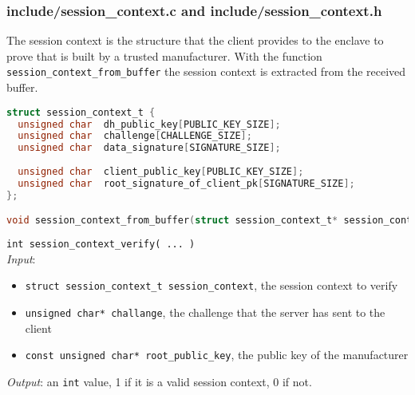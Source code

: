 \subsubsection{include/session\_context.c and include/session\_context.h}
The session context is the structure that the client provides to the enclave to prove that is built by a trusted manufacturer. With the function \texttt{session\_context\_from\_buffer} the session context is extracted from the received buffer. 
\begin{lstlisting}[language=C,frame=single]
struct session_context_t {
  unsigned char  dh_public_key[PUBLIC_KEY_SIZE];
  unsigned char  challenge[CHALLENGE_SIZE];
  unsigned char  data_signature[SIGNATURE_SIZE];
  
  unsigned char  client_public_key[PUBLIC_KEY_SIZE];
  unsigned char  root_signature_of_client_pk[SIGNATURE_SIZE];
};

void session_context_from_buffer(struct session_context_t* session_context, unsigned char* buffer);
\end{lstlisting}

\noindent
\texttt{int session\_context\_verify( ... )}\\
\textit{Input}:
\begin{itemize}[noitemsep,nolistsep]
  \item \texttt{struct session\_context\_t session\_context}, the session context to verify
  \item \texttt{unsigned char* challange}, the challenge that the server has sent to the client
  \item \texttt{const unsigned char* root\_public\_key}, the public key of the manufacturer
\end{itemize}
\textit{Output}: an \texttt{int} value, 1 if it is a valid session context, 0 if not.


